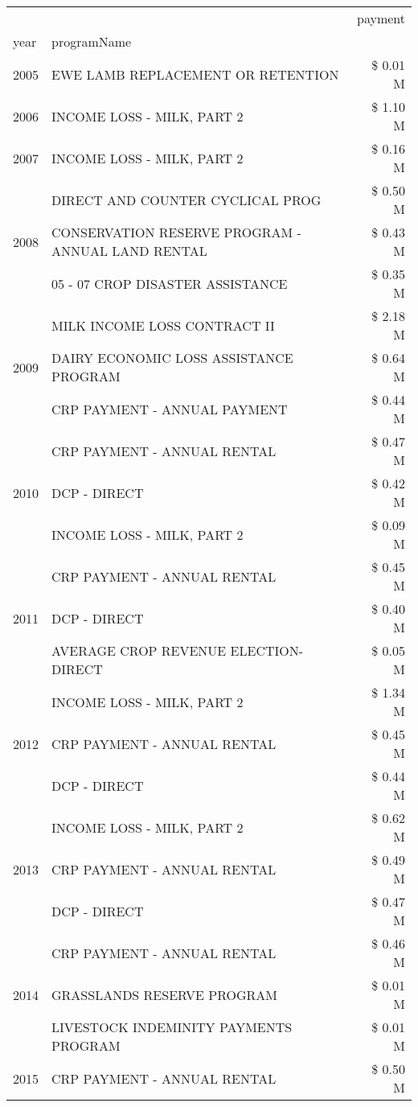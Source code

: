 \begin{tabular}{llr}
\toprule
 &  & payment \\
year & programName &  \\
\midrule
2005 & EWE LAMB REPLACEMENT OR RETENTION & \$ 0.01 M \\
\cline{1-3}
2006 & INCOME LOSS - MILK, PART 2 & \$ 1.10 M \\
\cline{1-3}
2007 & INCOME LOSS - MILK, PART 2 & \$ 0.16 M \\
\cline{1-3}
\multirow[t]{3}{*}{2008} & DIRECT AND COUNTER CYCLICAL PROG & \$ 0.50 M \\
 & CONSERVATION RESERVE PROGRAM - ANNUAL LAND RENTAL & \$ 0.43 M \\
 & 05 - 07 CROP DISASTER ASSISTANCE & \$ 0.35 M \\
\cline{1-3}
\multirow[t]{3}{*}{2009} & MILK INCOME LOSS CONTRACT II & \$ 2.18 M \\
 & DAIRY ECONOMIC LOSS ASSISTANCE PROGRAM & \$ 0.64 M \\
 & CRP PAYMENT - ANNUAL PAYMENT & \$ 0.44 M \\
\cline{1-3}
\multirow[t]{3}{*}{2010} & CRP PAYMENT - ANNUAL RENTAL & \$ 0.47 M \\
 & DCP - DIRECT & \$ 0.42 M \\
 & INCOME LOSS - MILK, PART 2 & \$ 0.09 M \\
\cline{1-3}
\multirow[t]{3}{*}{2011} & CRP PAYMENT - ANNUAL RENTAL & \$ 0.45 M \\
 & DCP - DIRECT & \$ 0.40 M \\
 & AVERAGE CROP REVENUE ELECTION-DIRECT & \$ 0.05 M \\
\cline{1-3}
\multirow[t]{3}{*}{2012} & INCOME LOSS - MILK, PART 2 & \$ 1.34 M \\
 & CRP PAYMENT - ANNUAL RENTAL & \$ 0.45 M \\
 & DCP - DIRECT & \$ 0.44 M \\
\cline{1-3}
\multirow[t]{3}{*}{2013} & INCOME LOSS - MILK, PART 2 & \$ 0.62 M \\
 & CRP PAYMENT - ANNUAL RENTAL & \$ 0.49 M \\
 & DCP - DIRECT & \$ 0.47 M \\
\cline{1-3}
\multirow[t]{3}{*}{2014} & CRP PAYMENT - ANNUAL RENTAL & \$ 0.46 M \\
 & GRASSLANDS RESERVE PROGRAM & \$ 0.01 M \\
 & LIVESTOCK INDEMINITY PAYMENTS PROGRAM & \$ 0.01 M \\
\cline{1-3}
\multirow[t]{3}{*}{2015} & CRP PAYMENT - ANNUAL RENTAL & \$ 0.50 M \\

\end{tabular}
